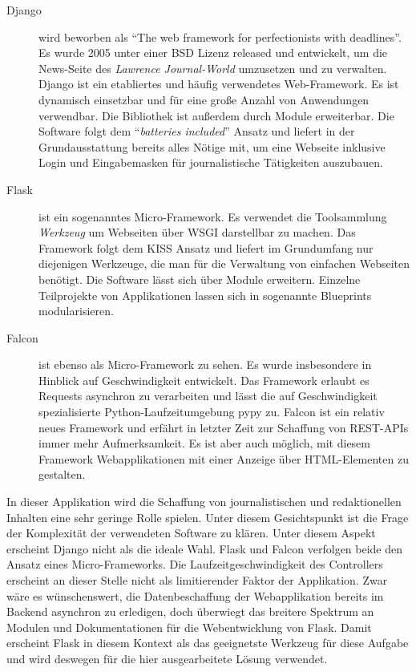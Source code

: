 \begin{description}
 \item [Django] wird beworben als "`The web framework for perfectionists with dead\-lines"'. Es wurde 2005 unter einer BSD Lizenz released und entwickelt, um die News-Seite des \textit{Lawrence Journal-World} umzusetzen und zu verwalten. Django ist ein etabliertes und häufig verwendetes Web-Framework. Es ist dynamisch einsetzbar und für eine große Anzahl von Anwendungen verwendbar. Die Bibliothek ist außerdem durch Module erweiterbar. Die Software folgt dem "`\textit{batteries included}"' Ansatz und liefert in der Grundausstattung bereits alles Nötige mit, um eine Webseite inklusive Login und Eingabemasken für journalistische Tätigkeiten auszubauen.

 \item [Flask] ist ein sogenanntes Micro-\gls{Framework}. Es verwendet die Toolsammlung \textit{Werkzeug} um Webseiten über \gls{WSGI} darstellbar zu machen. Das \gls{Framework} folgt dem \gls{KISS} Ansatz und liefert im Grundumfang nur diejenigen Werkzeuge, die man für die Verwaltung von einfachen Webseiten benötigt. Die Software lässt sich über Module erweitern. Einzelne Teilprojekte von Applikationen lassen sich in sogenannte Blueprints modularisieren.

 \item [Falcon] ist ebenso als Micro-\gls{Framework} zu sehen. Es wurde insbesondere in Hinblick auf Geschwindigkeit entwickelt. Das \gls{Framework} erlaubt es Requests asynchron zu verarbeiten und lässt die auf Geschwindigkeit spezialisierte Python-Laufzeitumgebung pypy zu. Falcon ist ein relativ neues \gls{Framework} und erfährt in letzter Zeit zur Schaffung von REST-APIs immer mehr Aufmerksamkeit. Es ist aber auch möglich, mit diesem \gls{Framework} Webapplikationen mit einer Anzeige über HTML-Elementen zu gestalten.
\end{description}

In dieser Applikation wird die Schaffung von journalistischen und redaktionellen Inhalten eine sehr geringe Rolle spielen. Unter diesem Gesichtspunkt ist die Frage der Komplexität der verwendeten Software zu klären. Unter diesem Aspekt erscheint Django nicht als die ideale Wahl.
Flask und Falcon verfolgen beide den Ansatz eines Micro-Frameworks. Die Laufzeitgeschwindigkeit des \gls{Controller}s erscheint an dieser Stelle nicht als limitierender Faktor der Applikation. Zwar wäre es wünschenswert, die Datenbeschaffung der Webapplikation bereits im Backend asynchron zu erledigen, doch überwiegt das breitere Spektrum an Modulen und Dokumentationen für die Webentwicklung von Flask.
Damit erscheint Flask in diesem Kontext als das geeignetste Werkzeug für diese Aufgabe und wird deswegen für die hier ausgearbeitete Lösung verwendet.


